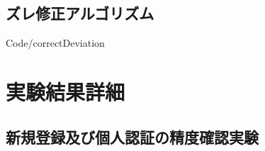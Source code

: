 \documentclass[11pt]{jreport}
\renewcommand{\slash}{/}
\begin{document}
    \section{ズレ修正アルゴリズム}
    
    {Code\slash correctDeviation}

\chapter{実験結果詳細}
\section{新規登録及び個人認証の精度確認実験}
\label{detail}
\end{document}

